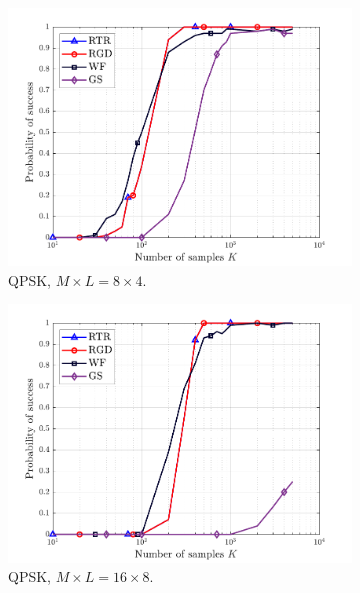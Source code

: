 \begin{figure}[htp]
	\centering
	\begin{subfigure}{0.48\linewidth}
		\centering
		\includegraphics[width=0.95\linewidth]{./figs/rocma_figs/ROCMA_MSR_TI_QgSt_success_4QAM_L=4_M=8_J=4_nSim_100.pdf}
		\caption{QPSK, $M\times L = 8\times4$.}\label{rocma:fig:CMA_ROCMA_success_8x4_4qam}	
	\end{subfigure}
	\begin{subfigure}{0.48\linewidth}
		\centering
		\includegraphics[width=0.95\linewidth]{./figs/rocma_figs/ROCMA_MSR_TI_QgSt_success_4QAM_L=8_M=16_J=8_nSim_100.pdf}
		\caption{QPSK, $M\times L = 16\times8$.}\label{rocma:fig:CMA_ROCMA_success_16x8_4qam}		
	\end{subfigure}\\
	\begin{subfigure}{0.48\linewidth}

\end{subfigure}
\end{figure}
